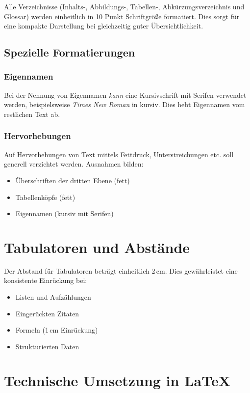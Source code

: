 Alle Verzeichnisse (Inhalts-, Abbildungs-, Tabellen-, Abkürzungsverzeichnis und Glossar) werden einheitlich in 10 Punkt Schriftgröße formatiert. Dies sorgt für eine kompakte Darstellung bei gleichzeitig guter Übersichtlichkeit.

\subsection*{Spezielle Formatierungen}
\label{subsec:spezielle_formatierungen}

\subsubsection{Eigennamen}
Bei der Nennung von Eigennamen \textit{kann} eine Kursivschrift mit Serifen verwendet werden, beispielsweise \emph{Times New Roman} in kursiv. Dies hebt Eigennamen vom restlichen Text ab.

\subsubsection{Hervorhebungen}
Auf Hervorhebungen von Text mittels Fettdruck, Unterstreichungen etc. soll generell verzichtet werden. Ausnahmen bilden:
\begin{itemize}
	\item Überschriften der dritten Ebene (fett)
	\item Tabellenköpfe (fett)
	\item Eigennamen (kursiv mit Serifen)
\end{itemize}


\section{Tabulatoren und Abstände}
\label{sec:tabulatoren}

Der Abstand für Tabulatoren beträgt einheitlich 2\,cm. Dies gewährleistet eine konsistente Einrückung bei:
\begin{itemize}
	\item Listen und Aufzählungen
	\item Eingerückten Zitaten
	\item Formeln (1\,cm Einrückung)
	\item Strukturierten Daten
\end{itemize}

\section{Technische Umsetzung in \LaTeX}
\label{sec:technische_umsetzung}

